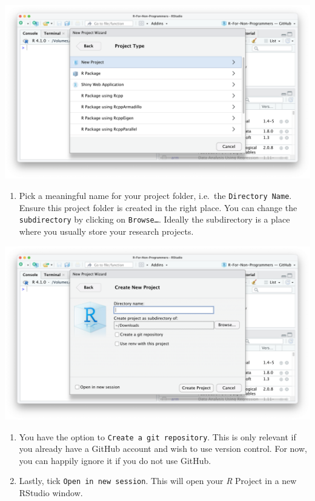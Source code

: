 \documentclass[
  letterpaper,
  DIV=11,
  numbers=noendperiod]{scrreprt}
\providecommand{\tightlist}{%
  \setlength{\itemsep}{0pt}\setlength{\parskip}{0pt}}\usepackage{longtable,booktabs,array}
\begin{document}
\includegraphics{images/chapter_06_img/00_r_project/02_r_project_new_project.png}

\begin{enumerate}
\def\labelenumi{\arabic{enumi}.}
\setcounter{enumi}{3}
\tightlist
\item
  Pick a meaningful name for your project folder, i.e.~the
  \texttt{Directory\ Name}. Ensure this project folder is created in the
  right place. You can change the \texttt{subdirectory} by clicking on
  \texttt{Browse…}. Ideally the subdirectory is a place where you
  usually store your research projects.
\end{enumerate}

\includegraphics{images/chapter_06_img/00_r_project/03_r_project_specs.png}

\begin{enumerate}
\def\labelenumi{\arabic{enumi}.}
\setcounter{enumi}{4}
\item
  You have the option to \texttt{Create\ a\ git\ repository}. This is
  only relevant if you already have a GitHub account and wish to use
  version control. For now, you can happily ignore it if you do not use
  GitHub.
\item
  Lastly, tick \texttt{Open\ in\ new\ session}. This will open your
  \emph{R} Project in a new RStudio window.
\end{enumerate}
\end{document}
